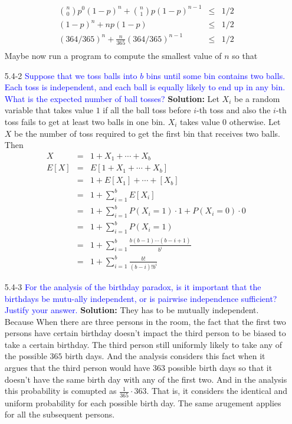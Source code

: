 \documentclass{article}
\begin{document}
\begin{enumerate}
\begin{eqnarray*}
\binom{n}{0}p^0(1-p)^{n} + \binom{n}{1}p(1-p)^{n-1} &\leq& 1/2 \\
(1-p)^{n} + np(1-p) &\leq& 1/2\\
(364/365)^n + \frac{n}{365}(364/365)^{n-1} &\leq& 1/2\\
\end{eqnarray*}
Maybe now run a program to compute the smallest value of $n$ so that 
\item[5.4-2] \textcolor{blue}{Suppose that we toss balls into $b$ bins until some bin contains two balls. Each toss is independent, and each ball is equally likely to end up in any bin. What is the expected number of ball tosses?}
\textbf{Solution:} Let $X_i$ be a random variable that takes value $1$ if all the ball toss before $i$-th toss and also the $i$-th toss fails to get at least two balls in one bin. $X_i$ takes value $0$ otherwise. Let $X$ be the number of toss required to get the first bin that receives two balls. Then 
\begin{eqnarray*}
X &=& 1 + X_1 + \cdots + X_b \\
E[X] &=& E[1 + X_1 + \cdots + X_b] \\
&=& 1 + E[X_1] + \cdots + [X_b]\\
&=& 1 + \sum_{i=1}^{b}E[X_i]\\
&=& 1 + \sum_{i=1}^{b}P(X_i = 1)\cdot1 + P(X_i = 0)\cdot0\\
&=& 1 + \sum_{i=1}^{b}P(X_i = 1)\\
&=& 1 + \sum_{i=1}^{b}\frac{b(b-1) \cdots (b-i+1)}{b^i}\\
&=& 1 + \sum_{i=1}^{b}\frac{b!}{(b-i)!b^i}
\end{eqnarray*}
\item[5.4-3] \textcolor{blue}{For the analysis of the birthday paradox, is it important that the birthdays be mutu-ally independent, or is pairwise independence sufficient? Justify your answer.}
\textbf{Solution:} They has to be mutually independent. Because When there are three persons in the room, the fact that the first two persons have certain birthday doesn't impact the third person to be biased to take a certain birthday. The third person still uniformly likely to take any of the possible $365$ birth days. And the analysis considers this fact when it argues that the third person would have 363 possible birth days so that it doesn't have the same birth day with any of the first two. And in the analysis this probability is comupted as $\frac{1}{365}\cdot 363$. That is, it considers the identical and uniform probability for each possible birth day. The same arugement applies for all the subsequent persons.

\end{enumerate}
\end{document}
